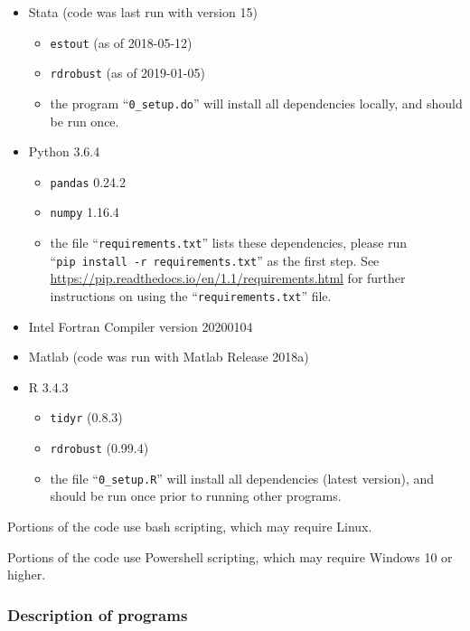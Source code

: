 \documentclass[
]{article}
\providecommand{\tightlist}{%
  \setlength{\itemsep}{0pt}\setlength{\parskip}{0pt}}
\begin{document}
\begin{itemize}
\tightlist
\item
  Stata (code was last run with version 15)

  \begin{itemize}
  \tightlist
  \item
    \texttt{estout} (as of 2018-05-12)
  \item
    \texttt{rdrobust} (as of 2019-01-05)
  \item
    the program ``\texttt{0\_setup.do}'' will install all dependencies
    locally, and should be run once.
  \end{itemize}
\item
  Python 3.6.4

  \begin{itemize}
  \tightlist
  \item
    \texttt{pandas} 0.24.2
  \item
    \texttt{numpy} 1.16.4
  \item
    the file ``\texttt{requirements.txt}'' lists these dependencies,
    please run ``\texttt{pip\ install\ -r\ requirements.txt}'' as the
    first step. See
    \url{https://pip.readthedocs.io/en/1.1/requirements.html} for
    further instructions on using the ``\texttt{requirements.txt}''
    file.
  \end{itemize}
\item
  Intel Fortran Compiler version 20200104
\item
  Matlab (code was run with Matlab Release 2018a)
\item
  R 3.4.3

  \begin{itemize}
  \tightlist
  \item
    \texttt{tidyr} (0.8.3)
  \item
    \texttt{rdrobust} (0.99.4)
  \item
    the file ``\texttt{0\_setup.R}'' will install all dependencies
    (latest version), and should be run once prior to running other
    programs.
  \end{itemize}
\end{itemize}

Portions of the code use bash scripting, which may require Linux.

Portions of the code use Powershell scripting, which may require Windows
10 or higher.

\hypertarget{description-of-programs}{%
\subsubsection{Description of programs}\label{description-of-programs}}
\end{document}
